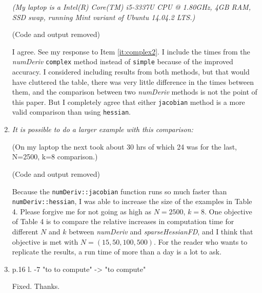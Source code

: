 \documentclass{article}
\newcommand{\pkg}[1]{\emph{#1}}
\newcommand{\code}[1]{\texttt{#1}}
\newcommand{\func}[1]{\code{#1}}
\newcommand{\method}[1]{\func{#1}}
\newenvironment{revQuote}{\itshape}{\vspace{\baselineskip}}
\newenvironment{response}{\normalfont}{\vspace{\baselineskip}}
\begin{document}
\begin{enumerate}[align=left]
\begin{revQuote}
(My laptop is a  Intel(R) Core(TM) i5-3337U CPU @ 1.80GHz,  4GB RAM, SSD
swap, running Mint variant of Ubuntu 14.04.2 LTS.)

(Code and output removed)
  \end{revQuote}
  
  \begin{response}
    I agree.  See my response to Item \ref{it:complex2}.  I include the
    times from the \pkg{numDeriv}
    \method{complex} method instead of \method{simple} because of the
    improved accuracy.  I considered including results from both methods,
    but that would have cluttered the table, there was very
    little difference in the times between them, and the comparison
    between two \pkg{numDeriv} methods is not the point of this
    paper. But I completely agree that either \func{jacobian} method
    is a more valid comparison than using \func{hessian}.
  \end{response}

\item\begin{revQuote}
It is possible to do a larger example with this comparison:

(On my laptop the next took about 30 hrs of which 24 was for the last,
N=2500, k=8 comparison.)

(Code and output removed)

  \end{revQuote}
  
  \begin{response}
Because the \func{numDeriv::jacobian} function runs so much faster
than  \func{numDeriv::hessian}, I was able to increase the size of the
examples in Table 4. Please forgive me for not going as high as
$N=2500$, $k=8$. One objective of Table 4 is to compare the relative
increases in computation time for different $N$ and $k$ between
\pkg{numDeriv} and \pkg{sparseHessianFD}, and I think that objective
is met with $N=(15, 50, 100, 500)$.  For the reader who wants to
replicate the results, a run time of more than a day is a lot to ask.
  \end{response}

\item\begin{revQuote}

 p.16  l. -7 "to to compute" -> "to compute"


  \end{revQuote}
  
  \begin{response}
    Fixed.  Thanks.
  \end{response}


\end{enumerate}
\end{document}
